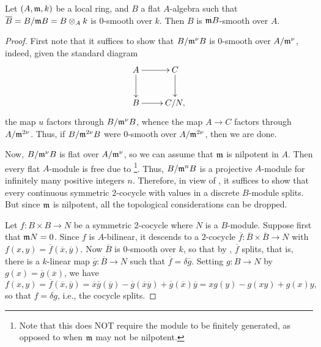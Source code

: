 \begin{theorem}
    Let $(A,\mathfrak{m}, k)$ be a local ring, and $B$ a flat $A$-algebra such that $\overline B = B/\mathfrak{m} B = B\otimes_A k$ is $0$-smooth over $k$. Then $B$ is $\mathfrak{m} B$-smooth over $A$.
\end{theorem}
\begin{proof}
    First note that it suffices to show that $B/\mathfrak{m}^\nu B$ is $0$-smooth over $A/\mathfrak{m}^\nu$, indeed, given the standard diagram 
    \begin{equation*}
        \xymatrix {
            A\ar[r]\ar[d] & C\ar[d]\\
            B\ar[r] & C/N,
        }
    \end{equation*}
    the map $u$ factors through $B/\mathfrak{m}^\nu B$, whence the map $A\to C$ factors through $A/\mathfrak{m}^{2\nu}$. Thus, if $B/\mathfrak{m}^{2\nu} B$ were $0$-smooth over $A/\mathfrak{m}^{2\nu}$, then we are done. 

    Now, $B/\mathfrak{m}^\nu B$ is flat over $A/\mathfrak{m}^\nu$, so we can assume that $\mathfrak{m}$ is nilpotent in $A$. Then every flat $A$-module is free due to \cite[Theorem 7.10]{matsumura-crt}\footnote{Note that this does NOT require the module to be finitely generated, as opposed to when $\mathfrak{m}$ may not be nilpotent.}. Thus, $B/\mathfrak{m}^n B$ is a projective $A$-module for infinitely many positive integers $n$. Therefore, in view of , it suffices to show that every continuous symmetric $2$-cocycle with values in a discrete $B$-module splits. But since $\mathfrak{m}$ is nilpotent, all the topological considerations can be dropped. 

    Let $f\colon B\times B\to N$ be a symmetric $2$-cocycle where $N$ is a $B$-module. Suppose first that $\mathfrak{m} N = 0$. Since $f$ is $A$-bilinear, it descends to a $2$-cocycle $\overline f\colon\overline B\times\overline B\to N$ with $f(x, y) = \overline f(\overline x, \overline y)$. Now $\overline B$ is $0$-smooth over $k$, so that by , $\overline f$ splits, that is, there is a $k$-linear map $\overline g\colon\overline B\to N$ such that $\overline f = \delta\overline g$. Setting $g\colon B\to N$ by $g(x) = \overline g(\overline x)$, we have 
    \begin{equation*}
        f(x, y) = \overline f(\overline x, \overline y) = \overline x\overline g(\overline y) - \overline g(\overline x\overline y) + \overline g(\overline x)\overline y = xg(y) - g(xy) + g(x)y,
    \end{equation*}
    so that $f = \delta g$, i.e., the cocycle splits.


\end{proof}

